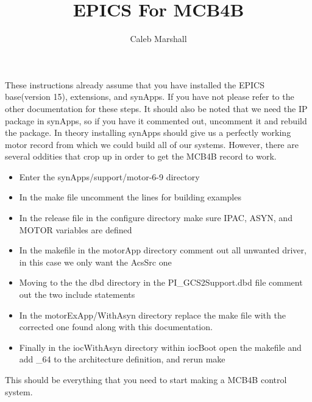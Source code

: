 \documentclass{article}
\begin{document}
 



\title{EPICS For MCB4B}
\date{}
\author{Caleb Marshall}
\maketitle

  These instructions already assume that you have installed the EPICS base(version 15), extensions, and synApps. If you have not please refer to
the other documentation for these steps. It should also be noted that we need the IP package in synApps, so if you have it commented out, uncomment it and 
rebuild the package. In theory installing synApps should give us a perfectly working motor record from which we could build all of our systems. However, 
there are several oddities that crop up in order to get the MCB4B record to work. 


 
\begin{itemize}
  \item Enter the synApps/support/motor-6-9 directory
  \item In the make file uncomment the lines for building examples
  \item In the release file in the configure directory make sure IPAC, ASYN, and MOTOR variables are defined
  \item In the makefile in the motorApp directory comment out all unwanted driver, in this case we only want the AcsSrc one
  \item Moving to the the dbd directory in the PI\_GCS2Support.dbd file comment out the two include statements
  \item In the motorExApp/WithAsyn directory replace the make file with the corrected one found along with this documentation.
  \item Finally in the iocWithAsyn directory within iocBoot open the makefile and add \_64 to the architecture definition, and rerun make 
\end{itemize}  
  

This should be everything that you need to start making a MCB4B control system.
 
 

 
 
\end{document}
